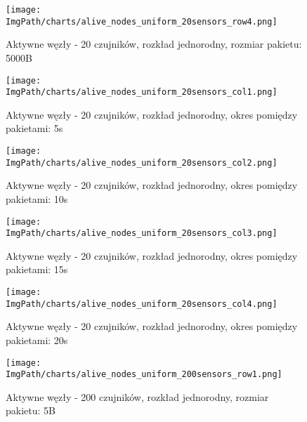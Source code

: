 \documentclass[a4paper,12pt,twoside,openany]{report}
\newcommand{\ImgPath}{./img}
\begin{document}
\begin{figure}[H]
	\begin{center}
		\texttt{[image: \\ImgPath/charts/alive\_nodes\_uniform\_20sensors\_row4.png]}
	\end{center}
	\caption{Aktywne węzły - 20 czujników, rozkład jednorodny, rozmiar pakietu: 5000B}
\end{figure}

\begin{figure}[H]
	\begin{center}
		\texttt{[image: \\ImgPath/charts/alive\_nodes\_uniform\_20sensors\_col1.png]}
	\end{center}
	\caption{Aktywne węzły - 20 czujników, rozkład jednorodny, okres pomiędzy pakietami: 5s}
\end{figure}

\begin{figure}[H]
	\begin{center}
		\texttt{[image: \\ImgPath/charts/alive\_nodes\_uniform\_20sensors\_col2.png]}
	\end{center}
	\caption{Aktywne węzły - 20 czujników, rozkład jednorodny, okres pomiędzy pakietami: 10s}
\end{figure}

\begin{figure}[H]
	\begin{center}
		\texttt{[image: \\ImgPath/charts/alive\_nodes\_uniform\_20sensors\_col3.png]}
	\end{center}
	\caption{Aktywne węzły - 20 czujników, rozkład jednorodny, okres pomiędzy pakietami: 15s}
\end{figure}

\begin{figure}[H]
	\begin{center}
		\texttt{[image: \\ImgPath/charts/alive\_nodes\_uniform\_20sensors\_col4.png]}
	\end{center}
	\caption{Aktywne węzły - 20 czujników, rozkład jednorodny, okres pomiędzy pakietami: 20s}
\end{figure}

\begin{figure}[H]
	\begin{center}
		\texttt{[image: \\ImgPath/charts/alive\_nodes\_uniform\_200sensors\_row1.png]}
	\end{center}
	\caption{Aktywne węzły - 200 czujników, rozkład jednorodny, rozmiar pakietu: 5B}
\end{figure}
\end{document}
